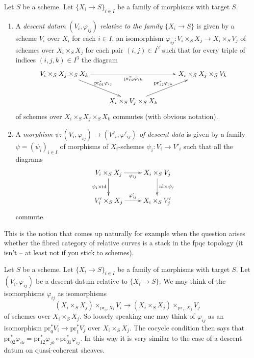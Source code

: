 \begin{definition}
\label{definition-descent-datum-for-family-of-morphisms}
Let $S$ be a scheme.
Let $\{X_i \to S\}_{i \in I}$ be a family of morphisms with target $S$.
\begin{enumerate}
\item A {\it descent datum $(V_i, \varphi_{ij})$ relative to the
family $\{X_i \to S\}$} is given by a scheme $V_i$ over $X_i$
for each $i \in I$, an isomorphism
$\varphi_{ij} : V_i \times_S X_j \to X_i \times_S V_j$
of schemes over $X_i \times_S X_j$ for each pair $(i, j) \in I^2$
such that for every triple of indices $(i, j, k) \in I^3$
the diagram
$$
\xymatrix{
V_i \times_S X_j \times_S X_k
\ar[rd]^{\text{pr}_{01}^*\varphi_{ij}}
\ar[rr]_{\text{pr}_{02}^*\varphi_{ik}} &
&
X_i \times_S X_j \times_S V_k\\
&
X_i \times_S V_j \times_S X_k
\ar[ru]^{\text{pr}_{12}^*\varphi_{jk}}
}
$$
of schemes over $X_i \times_S X_j \times_S X_k$ commutes
(with obvious notation).
\item A {\it morphism
$\psi : (V_i, \varphi_{ij}) \to (V'_i, \varphi'_{ij})$
of descent data} is given by a family
$\psi = (\psi_i)_{i \in I}$ of morphisms of
$X_i$-schemes $\psi_i : V_i \to V'_i$ such that all the diagrams
$$
\xymatrix{
V_i \times_S X_j \ar[r]_{\varphi_{ij}} \ar[d]_{\psi_i \times \text{id}} &
X_i \times_S V_j \ar[d]^{\text{id} \times \psi_j} \\
V'_i \times_S X_j \ar[r]^{\varphi'_{ij}} & X_i \times_S V'_j
}
$$
commute.
\end{enumerate}
\end{definition}

\noindent
This is the notion that comes up naturally for example when the question arises
whether the fibred category of relative curves is a stack in the
fpqc topology (it isn't -- at least not if you stick to schemes).

\begin{remark}
\label{remark-easier-family}
Let $S$ be a scheme.
Let $\{X_i \to S\}_{i \in I}$ be a family of morphisms with target $S$.
Let $(V_i, \varphi_{ij})$ be a descent datum relative to
$\{X_i \to S\}$. We may think of the isomorphisms $\varphi_{ij}$
as isomorphisms
$$
(X_i \times_S X_j) \times_{\text{pr}_0, X_i} V_i
\longrightarrow
(X_i \times_S X_j) \times_{\text{pr}_1, X_j} V_j
$$
of schemes over $X_i \times_S X_j$. So loosely speaking one may
think of $\varphi_{ij}$ as an isomorphism
$\text{pr}_0^*V_i \to \text{pr}_1^*V_j$ over $X_i \times_S X_j$.
The cocycle condition then says that
$\text{pr}_{02}^*\varphi_{ik} =
\text{pr}_{12}^*\varphi_{jk} \circ \text{pr}_{01}^*\varphi_{ij}$.
In this way it is very similar to the case of a descent datum on
quasi-coherent sheaves.
\end{remark}


